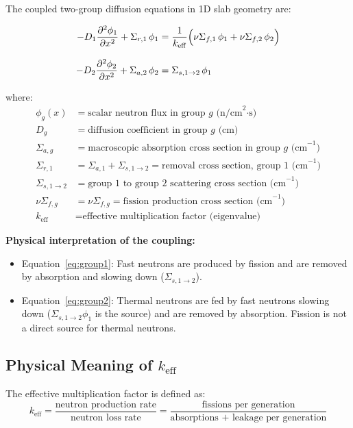 \documentclass[12pt,a4paper]{article}
\newcommand{\keff}{k_{\mathrm{eff}}}
\newcommand{\sigr}[1]{\Sigma_{r,#1}}
\newcommand{\siga}[1]{\Sigma_{a,#1}}
\newcommand{\sigs}[2]{\Sigma_{s,#1\to#2}}
\newcommand{\sigf}[1]{\nu\Sigma_{f,#1}}
\newcommand{\diff}[1]{D_{#1}}
\newcommand{\flux}[1]{\phi_{#1}}
\newcommand{\pdd}[2]{\frac{\partial^2 #1}{\partial #2^2}}
\begin{document}
The coupled two-group diffusion equations in 1D slab geometry are:

\begin{eqbox}
\begin{align}
  -\diff{1}\pdd{\flux{1}}{x} + \sigr{1}\,\flux{1}
  &= \frac{1}{\keff}\Bigl(\sigf{1}\,\flux{1} + \sigf{2}\,\flux{2}\Bigr)
  \label{eq:group1} \\[8pt]
  -\diff{2}\pdd{\flux{2}}{x} + \siga{2}\,\flux{2}
  &= \sigs{1}{2}\,\flux{1}
  \label{eq:group2}
\end{align}
\end{eqbox}

where:
\begin{align*}
  \flux{g}(x)   &= \text{scalar neutron flux in group } g \text{ (n/cm}^2\text{·s)} \\
  \diff{g}      &= \text{diffusion coefficient in group } g \text{ (cm)} \\
  \siga{g}      &= \text{macroscopic absorption cross section in group } g \text{ (cm}^{-1}) \\
  \sigr{1}      &= \siga{1} + \sigs{1}{2} = \text{removal cross section, group 1 (cm}^{-1}) \\
  \sigs{1}{2}   &= \text{group 1 to group 2 scattering cross section (cm}^{-1}) \\
  \sigf{g}      &= \nu\Sigma_{f,g} = \text{fission production cross section (cm}^{-1}) \\
  \keff         &= \text{effective multiplication factor (eigenvalue)}
\end{align*}

\textbf{Physical interpretation of the coupling:}
\begin{itemize}
  \item Equation~\eqref{eq:group1}: Fast neutrons are produced by fission
        and are removed by absorption and slowing down ($\sigs{1}{2}$).
  \item Equation~\eqref{eq:group2}: Thermal neutrons are fed by fast neutrons
        slowing down ($\sigs{1}{2}\flux{1}$ is the source) and are removed
        by absorption. Fission is not a direct source for thermal neutrons.
\end{itemize}

\subsection{Physical Meaning of $\keff$}

The effective multiplication factor is defined as:
\begin{equation}
  \keff = \frac{\text{neutron production rate}}{\text{neutron loss rate}}
        = \frac{\text{fissions per generation}}{\text{absorptions + leakage per generation}}
\end{equation}
\end{document}
